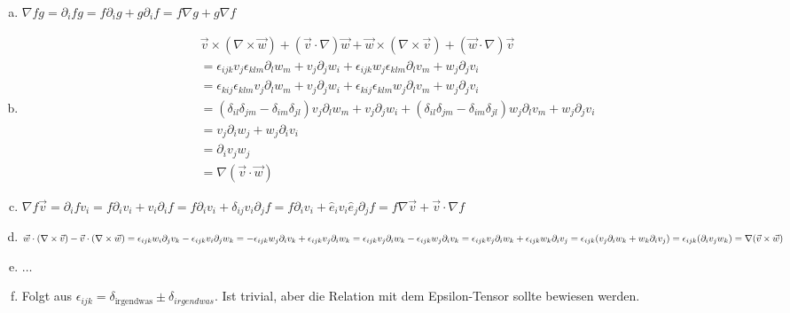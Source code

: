 \documentclass[a4paper,german,12pt,smallheadings]{scrartcl}
\begin{document}
\begin{enumerate}[a)]
  \item $\nabla fg = \partial_i f g = f \partial_i g + g \partial_i f = f \nabla g + g \nabla f$
  \item
    \begin{align*}
      &\vec{v} \times (\nabla \times \vec{w}) + (\vec{v} \cdot \nabla) \vec{w} + \vec{w} \times (\nabla \times \vec{v}) + (\vec{w} \cdot \nabla) \vec{v} \\
      &= \epsilon_{ijk} v_j \epsilon_{klm} \partial_l w_m + v_j \partial_j w_i + \epsilon_{ijk} w_j \epsilon_{klm} \partial_l v_m + w_j \partial_j v_i\\
      &= \epsilon_{kij} \epsilon_{klm} v_j \partial_l w_m + v_j \partial_j w_i + \epsilon_{kij} \epsilon_{klm} w_j \partial_l v_m + w_j \partial_j v_i\\
      &= (\delta_{il} \delta_{jm} - \delta_{im} \delta_{jl}) v_j \partial_l w_m + v_j \partial_j w_i + (\delta_{il} \delta_{jm} - \delta_{im}\delta_{jl}) w_j \partial_l v_m + w_j \partial_j v_i\\
      &= v_j \partial_i w_j + w_j \partial_i v_i\\
      &= \partial_i v_j w_j\\
      &= \nabla(\vec{v} \cdot \vec{w})
    \end{align*}
  \item $\nabla f \vec{v}
    = \partial_i f v_i
    = f \partial_i v_i + v_i \partial_i f
    = f \partial_i v_i + \delta_{ij} v_i \partial_j f
    = f \partial_i v_i + \hat{e}_iv_i \hat{e}_j \partial_j f
    = f \nabla \vec{v} + \vec{v} \cdot \nabla f$
  \item $\vec{w} \cdot (\nabla \times \vec{v}) - \vec{v} \cdot (\nabla \times \vec{w})
    = \epsilon_{ijk}w_i\partial_jv_k - \epsilon_{ijk} v_i \partial_j w_k
    = -\epsilon_{ijk} w_j \partial_ iv_k + \epsilon_{ijk} v_j \partial_i w_k \\
    =  \epsilon_{ijk} v_j \partial_i w_k - \epsilon_{ijk} w_j \partial_i v_k
    =  \epsilon_{ijk} v_j \partial_i w_k + \epsilon_{ijk} w_k \partial_i v_j
    =  \epsilon_{ijk} (v_j \partial_i w_k + w_k \partial_i v_j) \\
    =  \epsilon_{ijk} (\partial_i v_j w_k)
    = \nabla (\vec{v} \times \vec{w})$
  \item $\dots$
  \item Folgt aus $\epsilon_{ijk} = \delta_\text{irgendwas} \pm
    \delta_{irgendwas}$. Ist trivial, aber die Relation mit dem Epsilon-Tensor
    sollte bewiesen werden.
\end{enumerate}
\end{document}
